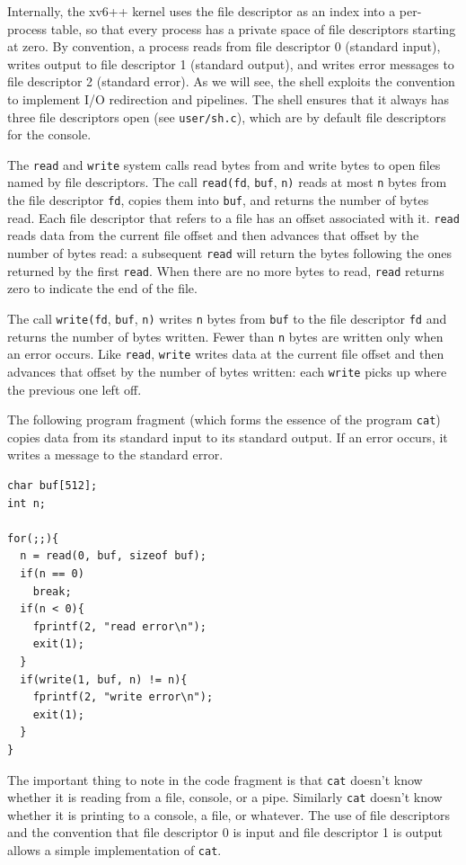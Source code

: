 Internally, the xv6++ kernel uses the file descriptor
as an index into a per-process table,
so that every process has a private space of file descriptors
starting at zero.
By convention, a process reads from file descriptor 0 (standard input),
writes output to file descriptor 1 (standard output), and
writes error messages to file descriptor 2 (standard error).
As we will see, the shell exploits the convention to implement I/O redirection
and pipelines. The shell ensures that it always has three file descriptors
open (see \texttt{user/sh.c}),
which are by default file descriptors for the console.

The
\lstinline{read}
and
\lstinline{write}
system calls read bytes from and write bytes to
open files named by file descriptors.
The call
\lstinline{read(fd},
\lstinline{buf},
\lstinline{n)}
reads at most
\lstinline{n}
bytes from the file descriptor
\lstinline{fd},
copies them into
\lstinline{buf},
and returns the number of bytes read.
Each file descriptor that refers to a file
has an offset associated with it.
\lstinline{read}
reads data from the current file offset and then advances
that offset by the number of bytes read:
a subsequent
\lstinline{read}
will return the bytes following the ones returned by the first
\lstinline{read}.
When there are no more bytes to read,
\lstinline{read}
returns zero to indicate the end of the file.

The call
\lstinline{write(fd},
\lstinline{buf},
\lstinline{n)}
writes
\lstinline{n}
bytes from
\lstinline{buf}
to the file descriptor
\lstinline{fd}
and returns the number of bytes written.
Fewer than
\lstinline{n}
bytes are written only when an error occurs.
Like
\lstinline{read},
\lstinline{write}
writes data at the current file offset and then advances
that offset by the number of bytes written:
each
\lstinline{write}
picks up where the previous one left off.

The following program fragment (which forms the essence of the program
\lstinline{cat})
copies data from its standard input
to its standard output.  If an error occurs, it writes a message
to the standard error.
\begin{lstlisting}[]
char buf[512];
int n;

for(;;){
  n = read(0, buf, sizeof buf);
  if(n == 0)
    break;
  if(n < 0){
    fprintf(2, "read error\n");
    exit(1);
  }
  if(write(1, buf, n) != n){
    fprintf(2, "write error\n");
    exit(1);
  }
}
\end{lstlisting}
The important thing to note in the code fragment is that
\lstinline{cat}
doesn't know whether it is reading from a file, console, or a pipe.
Similarly
\lstinline{cat}
doesn't know whether it is printing to a console, a file, or whatever.
The use of file descriptors and the convention that file descriptor 0
is input and file descriptor 1 is output allows a simple
implementation
of
\lstinline{cat}.

